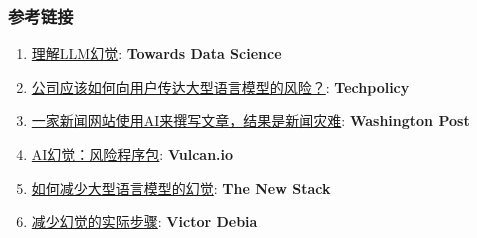 \documentclass[
]{article}
\providecommand{\tightlist}{%
  \setlength{\itemsep}{0pt}\setlength{\parskip}{0pt}}
\begin{document}
\subsubsection{参考链接}\label{ux53c2ux8003ux94feux63a5}

\begin{enumerate}
\def\labelenumi{\arabic{enumi}.}
\tightlist
\item
  \href{https://towardsdatascience.com/llm-hallucinations-ec831dcd7786}{理解LLM幻觉}:
  \textbf{Towards Data Science}
\item
  \href{https://techpolicy.press/how-should-companies-communicate-the-risks-of-large-language-models-to-users/}{公司应该如何向用户传达大型语言模型的风险？}:
  \textbf{Techpolicy}
\item
  \href{https://www.washingtonpost.com/media/2023/01/17/cnet-ai-articles-journalism-corrections/}{一家新闻网站使用AI来撰写文章，结果是新闻灾难}:
  \textbf{Washington Post}
\item
  \href{https://vulcan.io/blog/ai-hallucinations-package-risk}{AI幻觉：风险程序包}:
  \textbf{Vulcan.io}
\item
  \href{https://thenewstack.io/how-to-reduce-the-hallucinations-from-large-language-models/}{如何减少大型语言模型的幻觉}:
  \textbf{The New Stack}
\item
  \href{https://newsletter.victordibia.com/p/practical-steps-to-reduce-hallucination}{减少幻觉的实际步骤}:
  \textbf{Victor Debia}
\end{enumerate}
\end{document}
